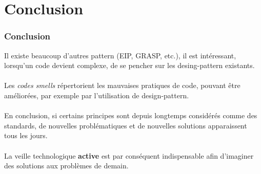 \section{Conclusion}
\begin{frame}[fragile]
	\frametitle{Conclusion}
Il existe beaucoup d'autres pattern (EIP, GRASP, etc.), il est int\'{e}ressant, lorsqu'un code devient complexe, de se pencher sur les desing-pattern existants.
\\~\\
Les \textit{codes smells} r\'{e}pertorient les mauvaises pratiques de code, pouvant \^{e}tre am\'{e}lior\'{e}es, par exemple par l'utilisation de design-pattern.
\\~\\
En conclusion, si certains principes sont depuis longtemps consid\'{e}r\'{e}s comme des standards, de nouvelles probl\'{e}matiques et de nouvelles solutions apparaissent tous les jours. 
\\~\\
La veille technologique \textbf{active} est par cons\'{e}quent indispensable afin d'imaginer des solutions aux probl\`{e}mes de demain.
\end{frame}
